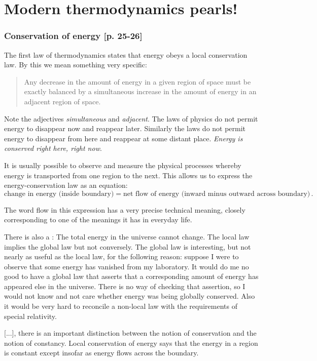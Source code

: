
\section{Modern thermodynamics pearls!}
%
\subsubsection{Conservation of energy [p. 25-26]}
%
The first law of thermodynamics states that energy obeys a local conservation law. By this we mean something very specific:
%
\begin{quotation}
  Any decrease in the amount of energy in a given region of space must be exactly balanced by a simultaneous increase in the amount of energy in an adjacent region of space.
\end{quotation}
%
Note the adjectives \emph{simultaneous} and \emph{adjacent}. The laws of physics do not permit energy to disappear now and reappear later. Similarly the laws do not permit energy to disappear from here and reappear at some distant place. \emph{Energy is conserved right here, right now}.

It is usually possible to observe and measure the physical processes whereby energy is transported from one region to the next. This allows us to express the energy-conservation law as an equation:
%
\begin{equation*}
  \text{change in energy (inside boundary)} = \text{net flow of energy (inward minus outward across boundary)}\,.
\end{equation*}

The word flow in this expression has a very precise technical meaning, closely corresponding to one of the meanings it has in everyday life.

There is also a : The total energy in the universe cannot change. The local law implies the global law but not conversely. The global law is interesting, but not nearly as useful as the local law, for the following reason: suppose I were to observe that some energy has vanished from my laboratory. It would do me no good to have a global law that asserts that a corresponding amount of energy has appeared  else in the universe. There is no way of checking that assertion, so I would not know and not care whether energy was being globally conserved. Also it would be very hard to reconcile a non-local law with the requirements of special relativity.

[...], there is an important distinction between the notion of conservation and the notion of constancy. Local conservation of energy says that the energy in a region is constant except insofar as energy flows across the boundary.


